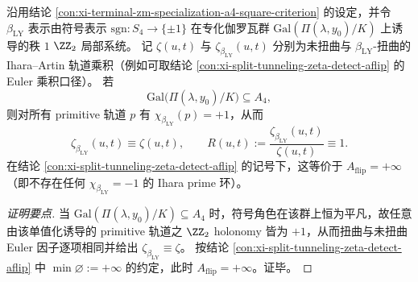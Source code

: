 \begin{conclusion}\label{con:xi-terminal-zm-a4-specialization-sign-channel-trivialization}
沿用结论 \ref{con:xi-terminal-zm-specialization-a4-square-criterion} 的设定，并令 \(\beta_{\mathrm{LY}}\) 表示由符号表示 \(\mathrm{sgn}:S_4\to\{\pm1\}\) 在专化伽罗瓦群 \(\mathrm{Gal}(\Pi(\lambda,y_0)/K)\) 上诱导的秩 \(1\) \(\ZZ_2\) 局部系统。
记 \(\zeta(u,t)\) 与 \(\zeta_{\beta_{\mathrm{LY}}}(u,t)\) 分别为未扭曲与 \(\beta_{\mathrm{LY}}\)-扭曲的 Ihara--Artin 轨道乘积（例如可取结论 \ref{con:xi-split-tunneling-zeta-detect-aflip} 的 Euler 乘积口径）。
若
\[
\mathrm{Gal}\bigl(\Pi(\lambda,y_{0})/K\bigr)\subseteq A_{4},
\]
则对所有 primitive 轨道 \(p\) 有 \(\chi_{\beta_{\mathrm{LY}}}(p)=+1\)，从而
\[
\zeta_{\beta_{\mathrm{LY}}}(u,t)\equiv \zeta(u,t),
\qquad
R(u,t):=\frac{\zeta_{\beta_{\mathrm{LY}}}(u,t)}{\zeta(u,t)}\equiv 1.
\]
在结论 \ref{con:xi-split-tunneling-zeta-detect-aflip} 的记号下，这等价于 \(A_{\mathrm{flip}}=+\infty\)（即不存在任何 \(\chi_{\beta_{\mathrm{LY}}}=-1\) 的 Ihara prime 环）。
\end{conclusion}
\begin{proof}[证明要点]
当 \(\mathrm{Gal}(\Pi(\lambda,y_0)/K)\subseteq A_4\) 时，符号角色在该群上恒为平凡，故任意由该单值化诱导的 primitive 轨道之 \(\ZZ_2\) holonomy 皆为 \(+1\)，从而扭曲与未扭曲 Euler 因子逐项相同并给出 \(\zeta_{\beta_{\mathrm{LY}}}\equiv \zeta\)。
按结论 \ref{con:xi-split-tunneling-zeta-detect-aflip} 中 \(\min\varnothing:=+\infty\) 的约定，此时 \(A_{\mathrm{flip}}=+\infty\)。证毕。
\end{proof}


